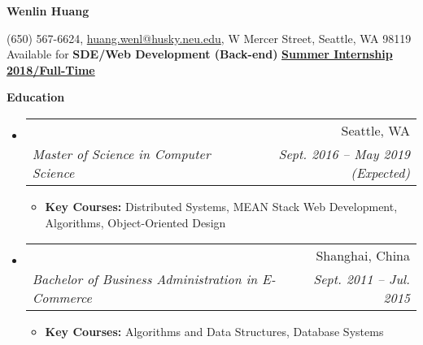 \documentclass[letterpaper,11pt]{article}
\makeatletter
\newcommand{\resitem}[1]{
    \item #1
    \vspace{-2pt}
}
\newcommand{\resheading}[1]{{\large \colorbox{mygrey}{\begin{minipage}{\textwidth}{\textbf{#1 \vphantom{p\^{E}}}}\end{minipage}}}}
\newcommand{\ressubheading}[4]{
\begin{tabular*}{6.80in}{l@{\extracolsep{\fill}}r}
    \textbf{#1} & #2 \\
    \textit{#3} & \textit{#4} \\
\end{tabular*}\vspace{-6pt}}
\makeatother
\begin{document}

    \centering\textbf{\huge Wenlin Huang}\\ \vspace{0.1in}

    (650) 567-6624,
    \href {mailto:huang.wenl@husky.neu.edu} {huang.wenl@husky.neu.edu},
    {W Mercer Street, Seattle, WA 98119} \\

    {
        Available for
        \textbf{SDE/Web Development ({Back-end})}
        \textbf{\underline{Summer Internship 2018/Full-Time}}
    }


    \resheading{Education}
    \begin{itemize}
        \item
        \ressubheading  %
        {\href
        {http://www.northeastern.edu}
        {Northeastern University}
        }
        {Seattle, WA}
        {Master of Science in Computer Science}
        {Sept. 2016 -- May 2019 (Expected)}
        {\footnotesize
        \begin{itemize}
            \resitem
            {
            \textbf{Key Courses:} Distributed Systems, MEAN Stack Web Development,
            Algorithms, Object-Oriented Design
            }
        \end{itemize}
        }

        \item
        \ressubheading
        {\href
        {http://www.shnu.edu.cn/}
        {Shanghai Normal University}
        }
        {Shanghai, China}
        {Bachelor of Business Administration in E-Commerce}
        {Sept. 2011 -- Jul. 2015}
        {
        \footnotesize
        \begin{itemize}
            \resitem
            {
            \textbf{Key Courses:} Algorithms and Data Structures, Database Systems
            }
        \end{itemize}
        }

    \end{itemize}
\end{document}
